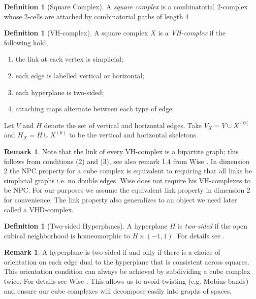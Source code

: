 \documentclass[12pt,parskip=full]{report}
\theoremstyle{plain}
\theoremstyle{definition}
\newtheorem{rmk}[thm]{Remark}
\newtheorem{dfn}[thm]{Definition}
\begin{document}
\begin{dfn}
    [Square Complex]
    A \emph{square complex} is a combinatorial 2-complex whose 2-cells are attached by combinatorial paths of length 4
\end{dfn}

\begin{dfn}
    [VH-complex]
    A square complex $X$ is a \emph{VH-complex} if the following hold,
    \begin{enumerate}
        \item the link at each vertex is simplicial;
        \item each edge is labelled vertical or horizontal;
        \item each hyperplane is two-sided;
        \item attaching maps alternate between each type of edge.
    \end{enumerate}
    Let $V$ and $H$ denote the set of vertical and horizontal edges. Take $V_X = V \cup X^{(0)}$ and $H_X = H \cup X^{(0)}$ to be the vertical and horizontal skeletons. 
\end{dfn}

\begin{rmk}
Note that the link of every VH-complex is a bipartite graph; this follows from conditions (2) and (3), see also remark 1.4 from Wise \cite{wisethesis}. In dimension 2 the NPC property for a cube complex is equivalent to requiring that all links be simplicial graphs i.e. no double edges. Wise does not require his VH-complexes to be NPC. For our purposes we assume the equivalent link property in dimension 2 for convenience. The link property also generalizes to an object we need later called a VHD-complex.
\end{rmk}

\begin{dfn}
    [Two-sided Hyperplanes]
    A hyperplane \(H\) is \emph{two-sided} if the open cubical neighborhood is homeomorphic to \(H\times (-1,1)\). For details see \cite{haglundwise}.
\end{dfn}

\begin{rmk}
    A hyperplane is two-sided if and only if there is a choice of orientation on each edge dual to the hyperplane that is consistent across squares. This orientation condition can always be achieved by subdividing a cube complex twice. For details see Wise \cite{wisecsc}. This allows us to avoid twisting (e.g. Mobius bands) and ensure our cube complexes will decompose easily into graphs of spaces.
\end{rmk}
\end{document}
